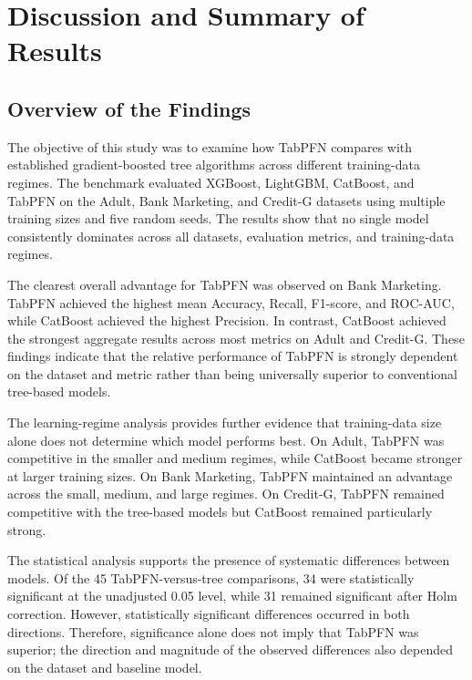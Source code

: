 \section{Discussion and Summary of Results}\label{discussion-and-summary-of-results}

\subsection{Overview of the Findings}\label{overview-of-the-findings}

The objective of this study was to examine how TabPFN compares with established gradient-boosted tree algorithms across different training-data regimes. The benchmark evaluated XGBoost, LightGBM, CatBoost, and TabPFN on the Adult, Bank Marketing, and Credit-G datasets using multiple training sizes and five random seeds. The results show that no single model consistently dominates across all datasets, evaluation metrics, and training-data regimes.

The clearest overall advantage for TabPFN was observed on Bank Marketing. TabPFN achieved the highest mean Accuracy, Recall, F1-score, and ROC-AUC, while CatBoost achieved the highest Precision. In contrast, CatBoost achieved the strongest aggregate results across most metrics on Adult and Credit-G. These findings indicate that the relative performance of TabPFN is strongly dependent on the dataset and metric rather than being universally superior to conventional tree-based models.

The learning-regime analysis provides further evidence that training-data size alone does not determine which model performs best. On Adult, TabPFN was competitive in the smaller and medium regimes, while CatBoost became stronger at larger training sizes. On Bank Marketing, TabPFN maintained an advantage across the small, medium, and large regimes. On Credit-G, TabPFN remained competitive with the tree-based models but CatBoost remained particularly strong.

The statistical analysis supports the presence of systematic differences between models. Of the 45 TabPFN-versus-tree comparisons, 34 were statistically significant at the unadjusted 0.05 level, while 31 remained significant after Holm correction. However, statistically significant differences occurred in both directions. Therefore, significance alone does not imply that TabPFN was superior; the direction and magnitude of the observed differences also depended on the dataset and baseline model.

